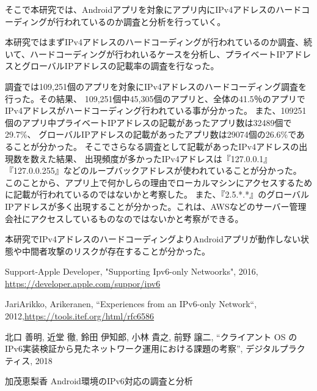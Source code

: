 \documentclass[twocolumn, 10pt, a4paper]{jarticle}
\begin{document}
そこで本研究では、Androidアプリを対象にアプリ内にIPv4アドレスのハードコーディングが行われているのか調査と分析を行っていく。

本研究ではまずIPv4アドレスのハードコーディングが行われているのか調査、続いて、ハードコーディングが行われいるケースを分析し、プライベートIPアドレスとグローバルIPアドレスの記載率の調査を行なった。


調査では109,251個のアプリを対象にIPv4アドレスのハードコーディング調査を行った。その結果、
109,251個中45,305個のアプリと、全体の41.5％のアプリでIPv4アドレスがハードコーディング行われている事が分かった。
また、109251個のアプリ中プライベートIPアドレスの記載があったアプリ数は32489個で29.7\%、
グローバルIPアドレスの記載があったアプリ数は29074個の26.6\%であることが分かった。
そこでさらなる調査として記載があったIPv4アドレスの出現数を数えた結果、
出現頻度が多かったIPv4アドレスは『127.0.0.1』『127.0.0.255』などのループバックアドレスが使われていることが分かった。
このことから、アプリ上で何かしらの理由でローカルマシンにアクセスするために記載が行われているのではないかと考察した。
また、『2.5.*.*』のグローバルIPアドレスが多く出現することが分かった。これは、AWSなどのサーバー管理会社にアクセスしているものなのではないかと考察ができる。

本研究でIPv4アドレスのハードコーディングよりAndroidアプリが動作しない状態や中間者攻撃のリスクが存在することが分かった。



\begin{thebibliography}{20}

Support-Apple Developer, "Supporting Ipv6-only Netwoorks", 2016, \url{https://developer.apple.com/suppor/ipv6}

JariArikko, Arikeranen, “Experiences from an IPv6-only Network“, 2012,\url{https://tools.itef.org/html/rfc6586}

北口 善明, 近堂 徹, 鈴田 伊知郎, 小林 貴之, 前野 譲二, “クライアント OS の IPv6実装検証から見たネットワーク運用における課題の考察”, デジタルプラクティス, 2018

加茂恵梨香 Android環境のIPv6対応の調査と分析

\end{thebibliography}
\end{document}
